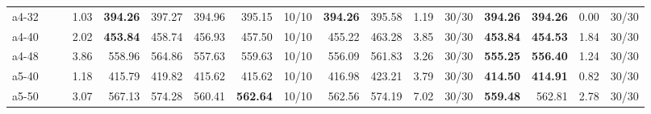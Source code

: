 \documentclass[aspectratio=1610]{beamer}
\begin{document}
\begin{frame}[noframenumbering]
\begin{table}[]
{\begin{tabular}{lrrrrrrrrrrrrrrrr}
a4-32                                          &                                                         & \multicolumn{1}{r|}{}                & 1.03                                                         & \textbf{394.26} & \multicolumn{1}{r|}{397.27}                                 & 394.96          & 395.15                                 & \multicolumn{1}{r|}{10/10} & \textbf{394.26} & 395.58                                 & 1.19   & \multicolumn{1}{r|}{30/30} & \textbf{394.26}    & {\color[HTML]{FE0000} \textbf{394.26}}    & 0.00      & 30/30   \\
a4-40                                          &                                                         & \multicolumn{1}{r|}{}                & 2.02                                                         & \textbf{453.84} & \multicolumn{1}{r|}{458.74}                                 & 456.93          & 457.50                                 & \multicolumn{1}{r|}{10/10} & 455.22          & 463.28                                 & 3.85   & \multicolumn{1}{r|}{30/30} & \textbf{453.84}    & {\color[HTML]{FE0000} \textbf{454.53}}    & 1.84      & 30/30   \\
a4-48                                          &                                                         & \multicolumn{1}{r|}{}                & 3.86                                                         & 558.96          & \multicolumn{1}{r|}{564.86}                                 & 557.63          & 559.63                                 & \multicolumn{1}{r|}{10/10} & 556.09          & 561.83                                 & 3.26   & \multicolumn{1}{r|}{30/30} & \textbf{555.25}    & {\color[HTML]{FE0000} \textbf{556.40}}    & 1.24      & 30/30   \\
a5-40                                          &                                                         & \multicolumn{1}{r|}{}                & 1.18                                                         & 415.79          & \multicolumn{1}{r|}{419.82}                                 & 415.62          & 415.62                                 & \multicolumn{1}{r|}{10/10} & 416.98          & 423.21                                 & 3.79   & \multicolumn{1}{r|}{30/30} & \textbf{414.50}    & {\color[HTML]{FE0000} \textbf{414.91}}    & 0.82      & 30/30   \\
a5-50                                          &                                                         & \multicolumn{1}{r|}{}                & 3.07                                                         & 567.13          & \multicolumn{1}{r|}{574.28}                                 & 560.41          & {\color[HTML]{FE0000} \textbf{562.64}} & \multicolumn{1}{r|}{10/10} & 562.56          & 574.19                                 & 7.02   & \multicolumn{1}{r|}{30/30} & \textbf{559.48}    & 562.81                                    & 2.78      & 30/30   \\ \hline
\end{tabular}%
}
\end{table}

\end{frame}
\end{document}
